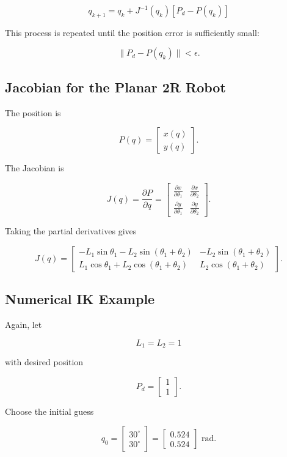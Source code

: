 \documentclass{article}
\begin{document}
\[
\boxed{
q_{k+1}
=
q_k+
J^{-1}(q_k)
\left[
P_d-P(q_k)
\right]
}
\]

This process is repeated until the position error is sufficiently small:

\[
\boxed{
\|P_d-P(q_k)\|<\epsilon.
}
\]


\subsection{Jacobian for the Planar 2R Robot}

The position is

\[
P(q)=
\begin{bmatrix}
x(q)\\
y(q)
\end{bmatrix}.
\]

The Jacobian is

\[
J(q)
=
\frac{\partial P}{\partial q}
=
\begin{bmatrix}
\frac{\partial x}{\partial\theta_1}
&
\frac{\partial x}{\partial\theta_2}
\\[4pt]
\frac{\partial y}{\partial\theta_1}
&
\frac{\partial y}{\partial\theta_2}
\end{bmatrix}.
\]

Taking the partial derivatives gives

\[
\boxed{
J(q)=
\begin{bmatrix}
-L_1\sin\theta_1-L_2\sin(\theta_1+\theta_2)
&
-L_2\sin(\theta_1+\theta_2)
\\[4pt]
L_1\cos\theta_1+L_2\cos(\theta_1+\theta_2)
&
L_2\cos(\theta_1+\theta_2)
\end{bmatrix}.
}
\]


\subsection{Numerical IK Example}

Again, let

\[
L_1=L_2=1
\]

with desired position

\[
P_d=
\begin{bmatrix}
1\\
1
\end{bmatrix}.
\]

Choose the initial guess

\[
q_0=
\begin{bmatrix}
30^\circ\\
30^\circ
\end{bmatrix}
=
\begin{bmatrix}
0.524\\
0.524
\end{bmatrix}
\text{ rad}.
\]
\end{document}

